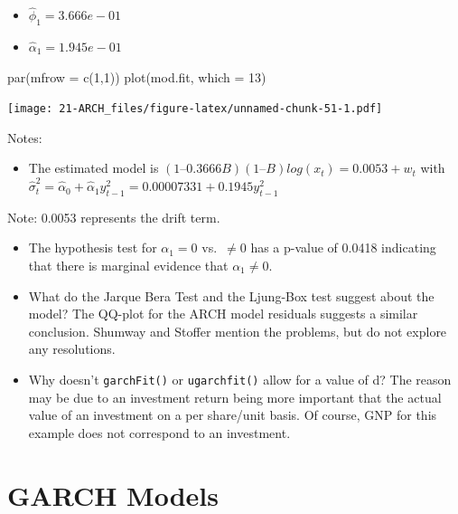 \documentclass[
]{book}
\newenvironment{Shaded}{\begin{snugshade}}{\end{snugshade}}
\newcommand{\AttributeTok}[1]{\textcolor[rgb]{0.77,0.63,0.00}{#1}}
\newcommand{\DecValTok}[1]{\textcolor[rgb]{0.00,0.00,0.81}{#1}}
\newcommand{\FunctionTok}[1]{\textcolor[rgb]{0.00,0.00,0.00}{#1}}
\newcommand{\NormalTok}[1]{#1}
\providecommand{\tightlist}{%
  \setlength{\itemsep}{0pt}\setlength{\parskip}{0pt}}
\theoremstyle{definition}
\theoremstyle{definition}
\theoremstyle{definition}
\theoremstyle{definition}
\theoremstyle{remark}
\begin{document}
\begin{itemize}
\item
  \(\hat \phi_1=3.666e-01\)
\item
  \(\hat \alpha_1=1.945e-01\)
\end{itemize}

\begin{Shaded}
\begin{Highlighting}[]
\FunctionTok{par}\NormalTok{(}\AttributeTok{mfrow =} \FunctionTok{c}\NormalTok{(}\DecValTok{1}\NormalTok{,}\DecValTok{1}\NormalTok{))}
\FunctionTok{plot}\NormalTok{(mod.fit, }\AttributeTok{which =} \DecValTok{13}\NormalTok{)}
\end{Highlighting}
\end{Shaded}

\texttt{[image: 21-ARCH\_files/figure-latex/unnamed-chunk-51-1.pdf]}

Notes:

\begin{itemize}
\tightlist
\item
  The estimated model is \((1 – 0.3666B)(1 – B)log(x_t) = 0.0053 + w_t\) with \(\hat \sigma_t^2=\hat \alpha_0+\hat \alpha_1y^2_{t-1}=0.00007331+0.1945y^2_{t-1}\)
\end{itemize}

Note: 0.0053 represents the drift term.

\begin{itemize}
\item
  The hypothesis test for \(\alpha_1 = 0\) vs.~\(\ne 0\) has a p-value of 0.0418 indicating that there is marginal evidence that \(\alpha_1 \ne 0\).
\item
  What do the Jarque Bera Test and the Ljung-Box test suggest about the model? The QQ-plot for the ARCH model residuals suggests a similar conclusion. Shumway and Stoffer mention the problems, but do not explore any resolutions.
\item
  Why doesn't \texttt{garchFit()} or \texttt{ugarchfit()} allow for a value of d? The reason may be due to an investment return being more important that the actual value of an investment on a per share/unit basis. Of course, GNP for this example does not correspond to an investment.
\end{itemize}

\hypertarget{garch-models}{%
\chapter{GARCH Models}\label{garch-models}}
\end{document}
